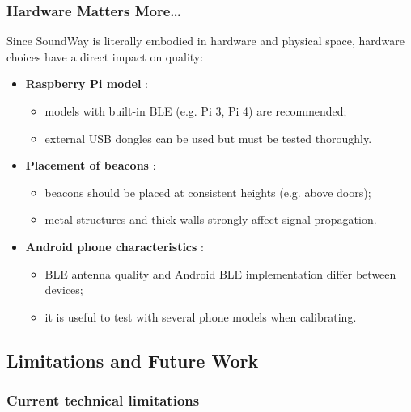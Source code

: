 \documentclass[12pt,a4paper]{article}
\begin{document}
\subsubsection{Hardware Matters More…}

Since SoundWay is literally embodied in hardware and physical space, hardware choices have a direct impact on quality:

\begin{itemize}
    \item \textbf{Raspberry Pi model} :
    \begin{itemize}
        \item models with built-in BLE (e.g. Pi 3, Pi 4) are recommended;
        \item external USB dongles can be used but must be tested thoroughly.
    \end{itemize}

    \item \textbf{Placement of beacons} :
    \begin{itemize}
        \item beacons should be placed at consistent heights (e.g. above doors);
        \item metal structures and thick walls strongly affect signal propagation.
    \end{itemize}

    \item \textbf{Android phone characteristics} :
    \begin{itemize}
        \item BLE antenna quality and Android BLE implementation differ between devices;
        \item it is useful to test with several phone models when calibrating.
    \end{itemize}
\end{itemize}

\newpage

\subsection{Limitations and Future Work}

\subsubsection{Current technical limitations}
\end{document}
